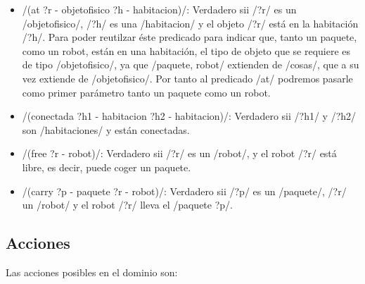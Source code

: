 \documentclass[	DIV=calc,%
							paper=a4,%
							fontsize=11pt]{scrartcl}	 					%
\begin{document}
\begin{itemize}

	\item \newlispinline/(at ?r - objetofisico ?h - habitacion)/: Verdadero sii \newlispinline/?r/ es un \newlispinline/objetofisico/, \newlispinline/?h/ es una \newlispinline/habitacion/ y el objeto \newlispinline/?r/ está en la habitación \newlispinline/?h/. Para poder reutilzar éste predicado para indicar que, tanto un paquete, como un robot, están en una habitación, el tipo de objeto que se requiere es de tipo \newlispinline/objetofisico/, ya que \newlispinline/paquete, robot/ extienden de \newlispinline/cosas/, que a su vez extiende de \newlispinline/objetofisico/. Por tanto al predicado \newlispinline/at/ podremos pasarle como primer parámetro tanto un paquete como un robot.

	\item \newlispinline/(conectada ?h1 - habitacion ?h2 - habitacion)/: Verdadero sii \newlispinline/?h1/ y \newlispinline/?h2/ son \newlispinline/habitaciones/ y están conectadas.

	\item \newlispinline/(free ?r - robot)/: Verdadero sii \newlispinline/?r/ es un \newlispinline/robot/, y el robot \newlispinline/?r/ está libre, es decir, puede coger un paquete.

	\item \newlispinline/(carry ?p - paquete ?r - robot)/: Verdadero sii \newlispinline/?p/ es un \newlispinline/paquete/, \newlispinline/?r/ un \newlispinline/robot/ y el robot \newlispinline/?r/ lleva el \newlispinline/paquete ?p/.
\end{itemize}

\subsection{Acciones}

	Las acciones posibles en el dominio son:
\end{document}

